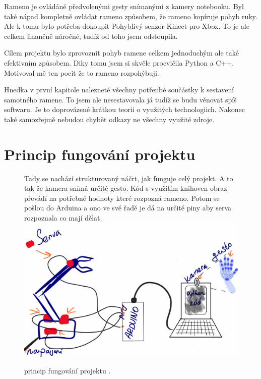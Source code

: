 \documentclass[12pt, a4paper,
twoside,        %
openright
]{report}
\begin{document}
{Rameno je ovládáné předvolenými gesty snímanými z kamery notebooku. Byl také nápad kompletně ovládat rameno způsobem, že rameno kopíruje pohyb ruky. Ale k tomu bylo potřeba dokoupit Pohyblivý senzor Kinect pro Xbox. To je ale celkem finančně náročné, tudíž od toho jsem odstoupila.	

Cílem projektu bylo zprovoznit pohyb ramene celkem jednoduchým ale také efektivním způsobem. Diky tomu jsem si skvěle procvičila Python a C++. Motivoval mě ten pocit že to rameno rozpohýbuji. 

Hnedka v první kapitole nalezneté  všechny potřenbé součástky k sestavení samotného ramene. To jsem ale nesestavovala já tudíž se budu věnovat spíš softwaru. Je to doprovázené krátkou teorii o využitých technologiich. Nakonec také samozřejmě nebudou chybět odkazy ne všechny využité zdroje. 


\chapter{Princip fungování projektu}
\begin{figure}[h]
	Tady se nachází strukturovaný náčrt, jak funguje celý projekt.
	A to tak že kamera snímá určité gesto. Kód s využitím knihoven obraz převádí na potřebné hodnoty které rozpozná rameno. Potom se pošlou do Arduina	a ono ve své řadě je dá na určité piny aby serva rozpoznala co mají dělat.
	\centering
	\includegraphics[width=0.9\linewidth]{image/princip.jpg} 
	
	
	\caption{princip fungování projektu \cite{princip}.} %
	\label{fig:princip} %
\end{figure}


}
\end{document}
